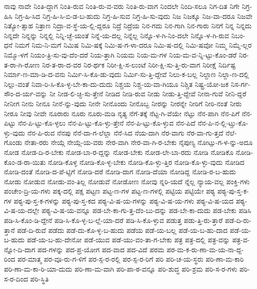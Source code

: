 {ನಾವು
ನಾವೇ
ನಿಂತಿ-ದ್ದಾಗ
ನಿಂತಿ-ರುವ
ನಿಂತಿ-ರು-ವ-ವರು
ನಿಂತಿ-ರು-ವಾಗ
ನಿಂದಲೇ
ನಿಂದಿ-ಸಲೂ
ನಿಗ-ದಿತ
ನಿಗೇ
ನಿಗ್ರ-ಹಿಸಿ
ನಿಗ್ರ-ಹಿ-ಸಿದ
ನಿಗ್ರ-ಹಿ-ಸಿ-ಬಿ-ಡ-ಬ-ಹುದು
ನಿಗ್ರ-ಹಿ-ಸುವ
ನಿಗ್ರ-ಹಿ-ಸು-ವುದು
ನಿಜ
ನಿಜಕ್ಕೂ
ನಿಜ-ವಾ-ದರೂ
ನಿಜವೇ
ನಿತ್ಯೋ-ತ್ಸಾಹ
ನಿತ್ರಾಣ
ನಿದ್ರಾ-ವ-ಸ್ಥೆ-ಯ-ಲ್ಲಿ-ದ್ದರೂ
ನಿದ್ರೆ
ನಿದ್ರೆಯ
ನಿನ-ಗದು
ನಿನ-ಗಾಗಿ
ನಿನ-ಗಾರು
ನಿನಗೆ
ನಿನ್ನ
ನಿನ್ನದು
ನಿನ್ನದೇ
ನಿನ್ನನ್ನು
ನಿನ್ನಲ್ಲಿ
ನಿನ್ನಿ-ಚ್ಛೆ-ಯಂತೆ
ನಿನ್ನೆ-ಯ-ದಲ್ಲ
ನಿನ್ನೆಲ್ಲ
ನಿನ್ನೊ-ಳ-ಗಿ-ನಿಂ-ದಲೇ
ನಿನ್ನೊ-ಳ-ಗಿ-ರುವ
ನಿಬಂ-ಧನೆ
ನಿಮಗೆ
ನಿಮ-ನಿ-ಮಗೆ
ನಿಮಿಷ
ನಿಮಿ-ಷಕ್ಕೆ
ನಿಮಿ-ಷ-ಗ-ಳಾ-ದರೂ
ನಿಮಿ-ಷ-ದಲ್ಲಿ
ನಿಮಿ-ಷವೋ
ನಿಮ್ಮ
ನಿಮ್ಮೆ-ಲ್ಲರ
ನಿಮ್ಮೊ-ಳಗೆ
ನಿಯಂ-ತ್ರಿ-ಸು-ವು-ದೆಂ-ದರೆ
ನಿಯ-ತ್ತಾಗಿ
ನಿಯಮ
ನಿಯ-ಮ-ಗಳ
ನಿಯ-ಮ-ವ-ನ್ನಿ-ಟ್ಟು-ಕೊಂ-ಡರೆ
ನಿರ-ತ-ರಾ-ಗಿ-ರೋಣ
ನಿರ-ತ-ರಾ-ದ-ವರ
ನಿರ-ರ್ಥಕ
ನಿರೀ-ಕ್ಷಿ-ಸ-ಲುಂಟೆ
ನಿರೀ-ಕ್ಷಿ-ಸು-ತ್ತಿ-ರು-ವಾಗ
ನಿರೀಕ್ಷೆ
ನಿರ್ದಿಷ್ಟ
ನಿರ್ಮಾ-ಣ-ಮಾ-ಡಿ-ದ-ವನು
ನಿರ್ಮಿ-ಸಿ-ಕೊ-ಡು-ವುದು
ನಿರ್ಮಿ-ಸು-ತ್ತಿ-ದ್ದೇವೆ
ನಿಲು-ಕ-ಬಲ್ಲ
ನಿಲ್ದಾಣ
ನಿಲ್ದಾ-ಣ-ದಲ್ಲಿ
ನಿಲ್ಲು-ವಂತೆ
ನಿವಾ-ರಿ-ಸಿ-ಕೊ-ಳ್ಳ-ಬೇ-ಕಾ-ದು-ದುದು
ನಿಶ್ಚಯ
ನಿಶ್ಚ-ಯ-ವಾ-ಗಿಯೂ
ನಿಶ್ಚಿತ
ನಿಷ್ಟ್ರ-ಯೋ-ಜಕ
ನಿಸ-ರ್ಗ-ಸೌಂ-ದ-ರ್ಯ-ವನ್ನು
ನೀ
ನೀಡ-ಲಿ-ಚ್ಛಿ-ಸು-ತ್ತೇನೆ
ನೀಡಿದ
ನೀಡಿ-ರುವ
ನೀಡು
ನೀಡು-ತ್ತಿ-ದ್ದೇವೆ
ನೀನಾ-ಗುವೆ
ನೀನಿ-ದ್ದರೆ
ನೀನೀಗ
ನೀನು
ನೀನೂ
ನೀನೆ-ನ್ನು-ವುದು
ನೀನೇ
ನೀನೊಂದು
ನೀನೊಬ್ಬ
ನೀರನ್ನು
ನೀರನ್ನೇ
ನೀರಿಗೆ
ನೀರಿ-ನಂತೆ
ನೀರು
ನೀರೂ
ನೀವು
ನೀವೇ
ನೂರಾರು
ನೂರು
ನೂರು-ಮಡಿ
ನೃತ್ಯ
ನೆಗೆ-ತಕ್ಕೆ
ನೆಟ್ಟ-ಗಿ-ವೆಯೇ
ನೆಟ್ಟು
ನೆನ-ಪಾಗಿ
ನೆನ-ಪಿಗೆ
ನೆನ-ಪಿಟ್ಟು
ನೆನ-ಪಿ-ಟ್ಟು-ಕೊ-ಳ್ಳಲು
ನೆನ-ಪಿ-ಟ್ಟು-ಕೊ-ಳ್ಳು-ತ್ತೇನೆ
ನೆನ-ಪಿ-ಟ್ಟು-ಕೊ-ಳ್ಳುವ
ನೆನ-ಪಿದೆ
ನೆನ-ಪಿ-ನ-ಲ್ಲಿ-ಟ್ಚು-ಕೊ-ಳ್ಳು-ವುದು
ನೆನ-ಪಿ-ರುವ
ನೆನಪು
ನೆನೆ-ದಾ-ಗ-ಲೆಲ್ಲಾ
ನೆನೆ-ಸಿದ
ನೆಯ-ದಾಗಿ
ನೆರ-ವಾಗು
ನೆರ-ವಾ-ಗು-ತ್ತದೆ
ನೆಲೆ-ಗೊಂಡು
ನೇತಾ-ರರು
ನೇಯ್ಗೆ
ನೇಯ್ಗೆ-ಯ-ವರು
ನೇರ-ವಾಗಿ
ನೇರ-ವಾ-ಗಿ-ರ-ಬೇಕು
ನೈಪುಣ್ಯ
ನೋಟ್ಸು-ಗ-ಳ-ನ್ನು-ಅದೂ
ನೋಡ
ನೋಡ-ದಿ-ರ-ಬೇಕು
ನೋಡ-ಬಾ-ರ-ದ್ದನ್ನು
ನೋಡ-ಬೇಕು
ನೋಡ-ಲೇ-ಬಾ-ರದು
ನೋಡಿ
ನೋಡಿಕೊ
ನೋಡಿ-ಕೊಂ-ಡ-ರಾ-ಯಿತು
ನೋಡಿ-ಕೊಳ್ಳ
ನೋಡಿ-ಕೊ-ಳ್ಳ-ಬೇಕು
ನೋಡಿ-ಕೊ-ಳ್ಳು-ತ್ತಿರ
ನೋಡಿ-ಕೊ-ಳ್ಳು-ವುದು
ನೋಡಿದ
ನೋಡಿ-ದಂತೆ
ನೋಡಿ-ದ-ಪೆ-ಟ್ಟಿಗೆ
ನೋಡಿ-ದರೆ
ನೋಡಿ-ದಾಗ
ನೋಡಿ-ದೆಯಾ
ನೋಡಿದ್ದ
ನೋಡಿ-ರ-ಬ-ಹುದು
ನೋಡು
ನೋಡುವ
ನೋಡು-ವಂ-ತಿಲ್ಲ
ನೋಡುವೆ
ನೋಡೋಣ
ನೋವು
ನ್ನರಿ-ಯದೆ
ನ್ನೆಲ್ಲ
ನ್ಯಾಯ-ವಲ್ಲ
ಪಂಕ್ತಿ-ಗಳು
ಪಂಚೇಂ-ದ್ರಿ-ಯ-ಗಳು
ಪಕ್ಕ-ದಲ್ಲಿ
ಪಕ್ಷ
ಪಟ್ಟಣ
ಪಟ್ಟ-ಣ-ಗಳ
ಪಟ್ಟ-ಣ-ಗಳಲ್ಲಿ
ಪಟ್ಟಿಯ
ಪಟ್ಟಿಯೇ
ಪಠ್ಯ
ಪಠ್ಯ-ಪು-ಸ್ತ-ಕ-ಗಳ
ಪಠ್ಯ-ಪು-ಸ್ತ-ಕ-ಗಳನ್ನು
ಪಠ್ಯ-ಪು-ಸ್ತ-ಕದ
ಪಠ್ಯ-ವಿ-ಷ-ಯ-ಗಳನ್ನು
ಪಠ್ಯ-ವಿ-ಷ-ಯ-ಗಳು
ಪಠ್ಯ-ವಿ-ಷ-ಯದ
ಪಠ್ಯ-ವಿ-ಷ-ಯ-ದಲ್ಲೇ
ಪಠ್ಯ-ವಿ-ಷ-ಯ-ವನ್ನೂ
ಪಡ-ಬೇ-ಕಾ-ಗು-ತ್ತ-ದೆಂ-ಬು-ದನ್ನು
ಪಡ-ಬೇ-ಕಾ-ದುದು
ಪಡ-ಬೇಕು
ಪಡಿಸಿ
ಪಡಿ-ಸಿ-ಕೊಂ-ಡಿ-ದ್ದೇನೆ
ಪಡಿ-ಸಿ-ಕೊ-ಳ್ಳ-ಬ-ಲ್ಲೆ-ಯಾ-ದರೆ
ಪಡಿ-ಸಿ-ಕೊ-ಳ್ಳುವ
ಪಡುತ್ತ
ಪಡು-ತ್ತಿ-ರು-ತ್ತಾರೆ
ಪಡೆ-ದಿ-ರು-ತ್ತಾನೆ
ಪಡೆ-ದಿ-ರುವೆ
ಪಡೆದು
ಪಡೆ-ದು-ಕೊ-ಳ್ಳ-ಬ-ಹುದು
ಪಡೆಯ
ಪಡೆ-ಯ-ಬಲ್ಲ
ಪಡೆ-ಯ-ಬ-ಹು-ದಾದ
ಪಡೆ-ಯ-ಬ-ಹುದು
ಪಡೆ-ಯ-ಬ-ಹು-ದೇನೋ
ಪಡೆ-ಯುವ
ಪಡೆ-ಯು-ವಂ-ತಾ-ಗ-ಬೇಕು
ಪತ್ರ
ಪತ್ರ-ದಲ್ಲಿ
ಪತ್ರ-ವನ್ನು
ಪತ್ರ-ವ-ನ್ನೋ-ದಿ-ದಾಗ
ಪದ-ಗಳನ್ನು
ಪದ-ಪ್ರ-ಯೋಗ
ಪದ-ವಾದ
ಪದ-ವಿದೆ
ಪರಮ
ಪರ-ಮ-ಕ-ರು-ಣಾ-ಮ-ಯ-ನಾ-ದ್ದ-ರಿಂದ
ಪರ-ಮಾತ್ಮ
ಪರ-ವೂ-ರು-ಗ-ಳಿಗೆ
ಪರ-ಸ್ಪ-ರ-ರಲ್ಲಿ
ಪರ-ಸ್ಪ-ರ-ರಿಗೆ
ಪರಿ
ಪರಿ-ಚ-ಯ-ಸ್ಥರು
ಪರಿ-ಣಾ-ಮ-ಕಾರಿ
ಪರಿ-ಣಾ-ಮ-ಕಾ-ರಿ-ಯಾ-ದುದು
ಪರಿ-ಣಾ-ಮ-ವಾಗಿ
ಪರಿ-ಪಾ-ಠ-ವನ್ನೂ
ಪರಿ-ಶುದ್ಧ
ಪರಿ-ಶ್ರಮ
ಪರಿ-ಸ-ರ-ಗಳು
ಪರಿ-ಸ-ರ-ದಿಂದ
ಪರಿ-ಸ್ಥಿತಿ
}
